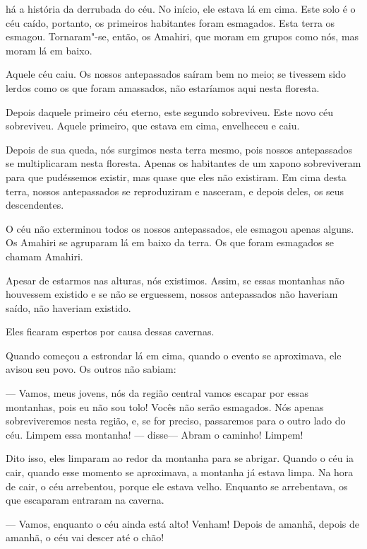  

 há a história da derrubada do céu. No início, ele
estava lá em cima. Este solo é o céu caído, portanto, os primeiros
habitantes foram esmagados. Esta terra os esmagou. Tornaram"-se, então,
os Amahiri, que moram em grupos como nós, mas moram lá em baixo. 

Aquele céu caiu. Os nossos antepassados saíram bem no meio; se tivessem
sido lerdos como os que foram amassados, não estaríamos aqui nesta
floresta. 

Depois daquele primeiro céu eterno, este segundo sobreviveu. Este novo
céu sobreviveu. Aquele primeiro, que estava em cima, envelheceu e caiu. 

Depois de sua queda, nós surgimos nesta terra mesmo, pois nossos
antepassados se multiplicaram nesta floresta. Apenas os habitantes de um
xapono sobreviveram para que pudéssemos existir, mas quase que eles não
existiram. Em cima desta terra, nossos antepassados se reproduziram e
nasceram, e depois deles, os seus descendentes. 

O céu não exterminou todos os nossos antepassados, ele esmagou apenas alguns. Os
Amahiri se agruparam lá em baixo da terra. Os que foram esmagados se
chamam Amahiri. 

Apesar de estarmos nas alturas, nós existimos. Assim, se essas montanhas
não houvessem existido e se não se erguessem, nossos antepassados não
haveriam saído, não haveriam existido. 

Eles ficaram espertos por causa dessas cavernas.

Quando começou a estrondar lá em cima, quando o evento se
aproximava, ele avisou seu povo. Os outros não sabiam:

--- Vamos, meus jovens, nós da região central vamos escapar por essas
montanhas, pois eu não sou tolo! Vocês não serão esmagados. Nós apenas
sobreviveremos nesta região, e, se for preciso, passaremos para o outro lado
do céu. Limpem essa montanha! --- disse--- Abram o caminho! Limpem! 

Dito isso, eles limparam ao redor da montanha para se abrigar. Quando o
céu ia cair, quando esse momento se aproximava, a montanha já estava
limpa. Na hora de cair, o céu arrebentou, porque ele estava velho.
Enquanto se arrebentava, os que escaparam entraram na caverna. 

--- Vamos, enquanto o céu ainda está alto! Venham! Depois de amanhã,
depois de amanhã, o céu vai descer até o chão! 

